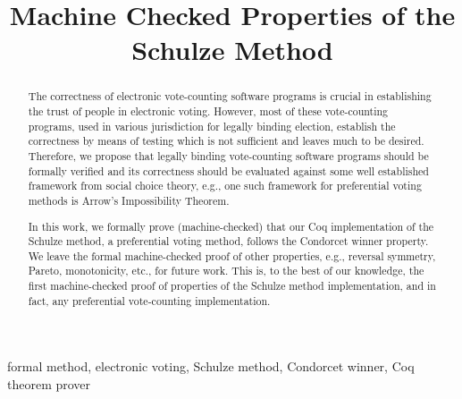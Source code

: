 \documentclass[compsoc,conference,a4paper,10pt,times]{IEEEtran}
\begin{document}
\title{Machine Checked Properties of the Schulze Method}

\author{
\and
{}
}

\maketitle

\begin{abstract}
The correctness of electronic vote-counting software programs is 
crucial in establishing the trust of people in electronic voting. 
However, most of these vote-counting programs, used in 
various jurisdiction for legally binding election, establish
the correctness by means of testing which is not sufficient and leaves much to be desired. 
Therefore, we propose that legally binding vote-counting software 
programs should be formally verified and its correctness should be 
evaluated against some well established framework from social choice theory, 
e.g., one 
such framework for preferential voting methods is Arrow's Impossibility 
Theorem.

In this work, 
we formally prove (machine-checked) that our Coq implementation of the Schulze method,
a preferential voting method, 
follows the Condorcet winner property. We leave the formal machine-checked proof of 
other properties, e.g., reversal symmetry, Pareto, monotonicity, etc., for future work. 
This is, to the best of our knowledge, the first machine-checked proof of 
properties of the Schulze method implementation, and in fact, any preferential vote-counting 
implementation. 


\end{abstract}

\begin{IEEEkeywords}
formal method, electronic voting, Schulze method, 
Condorcet winner, Coq theorem prover
\end{IEEEkeywords}
\end{document}
